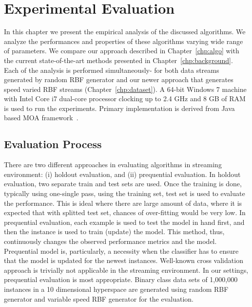 \chapter{Experimental Evaluation}
\label{chp:exp}
In this chapter we present the empirical analysis of the discussed algorithms. We analyze the performances and properties of these algorithms varying wide range of parameters. We compare our approach described in Chapter~\ref{chp:algo} with the current state-of-the-art methods presented in Chapter~\ref{chp:background}. Each of the analysis is performed simultaneously-  for both data streams generated by random RBF generator and our newer approach that generates speed varied RBF streams (Chapter~\ref{chp:dataset}). A 64-bit Windows 7 machine with Intel Core i7 dual-core processor clocking up to 2.4 GHz and 8 GB of RAM is used to run the experiments. Primary implementation is derived from Java based MOA framework~\cite{bifet:moa10}. 


\section{Evaluation Process}
There are two different approaches in evaluating algorithms in streaming environment: (i) holdout evaluation, and (ii) prequential evaluation. In holdout evaluation, two separate train and test sets are used. Once the training is done, typically using one-single pass, using the training set, test set is used to evaluate the performance. This is ideal where there are large amount of data, where it is expected that with splitted test set, chances of over-fitting would be very low. In prequential evaluation, each example is used to test the model in hand first, and then the instance is used to train (update) the model. This method, thus, continuously changes the observed performance metrics and the model. Prequential model is, particularly, a necessity when the classifier has to ensure that the model is updated for the newest instances. Well-known cross validation approach is trivially not applicable in the streaming environment. In our settings, prequential evaluation is most appropriate. Binary class data sets of 1,000,000 instances in a 10 dimensional hyperspace are generated using random RBF generator and variable speed RBF generator for the evaluation. 


